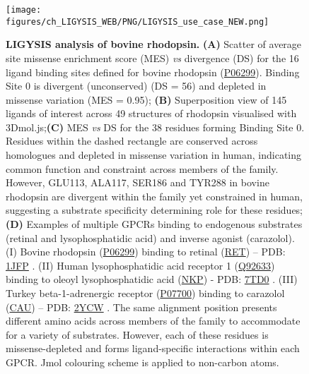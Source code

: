 \begin{figure}[htb!]
    \centering
    \texttt{[image: figures/ch\_LIGYSIS\_WEB/PNG/LIGYSIS\_use\_case\_NEW.png]}
    \caption[LIGYSIS analysis of bovine rhodopsin]{\textbf{LIGYSIS analysis of bovine rhodopsin.} \textbf{(A)} Scatter of average site missense enrichment score (MES) \textit{vs}  divergence (DS) for the 16 ligand binding sites defined for bovine rhodopsin (\href{https://www.uniprot.org/uniprotkb/P06299/entry}{P06299}). Binding Site 0 is divergent (unconserved) (DS = 56) and depleted in missense variation (MES = 0.95); \textbf{(B)} Superposition view of 145 ligands of interest across 49 structures of rhodopsin visualised with 3Dmol.js;\textbf{(C)} MES \textit{vs} DS for the 38 residues forming Binding Site 0. Residues within the dashed rectangle are conserved across homologues and depleted in missense variation in human, indicating common function and constraint across members of the family. However, GLU113, ALA117, SER186 and TYR288 in bovine rhodopsin are divergent within the family yet constrained in human, suggesting a substrate specificity determining role for these residues; \textbf{(D)} Examples of multiple GPCRs binding to endogenous substrates (retinal and lysophosphatidic acid) and inverse agonist (carazolol). (I) Bovine rhodopsin (\href{https://www.uniprot.org/uniprotkb/P06299/entry}{P06299}) binding to retinal (\href{https://www.ebi.ac.uk/pdbe-srv/pdbechem/chemicalCompound/show/RET}{RET}) – PDB: \href{https://www.ebi.ac.uk/pdbe/entry/pdb/1jfp}{1JFP} \cite{YEAGLE_2001_GPCRs}. (II) Human lysophosphatidic acid receptor 1 (\href{https://www.uniprot.org/uniprotkb/Q92633/entry}{Q92633}) binding to oleoyl lysophosphatidic acid (\href{https://www.ebi.ac.uk/pdbe-srv/pdbechem/chemicalCompound/show/NKP}{NKP}) - PDB: \href{https://www.ebi.ac.uk/pdbe/entry/pdb/7TD0}{7TD0} \cite{LIU_2022_GPCRs}. (III) Turkey beta-1-adrenergic receptor (\href{https://www.uniprot.org/uniprotkb/P07700/entry}{P07700}) binding to carazolol (\href{https://www.ebi.ac.uk/pdbe-srv/pdbechem/chemicalCompound/show/CAU}{CAU}) – PDB: \href{https://www.ebi.ac.uk/pdbe/entry/pdb/2YCW}{2YCW} \cite{MOUKHAMETZIANOV_2011_GPCRs}. The same alignment position presents different amino acids across members of the family to accommodate for a variety of substrates. However, each of these residues is missense-depleted and forms ligand-specific interactions within each GPCR. Jmol colouring scheme \cite{JMOL} is applied to non-carbon atoms.}
    \label{fig:ligysis_rhodopsin}
\end{figure}

